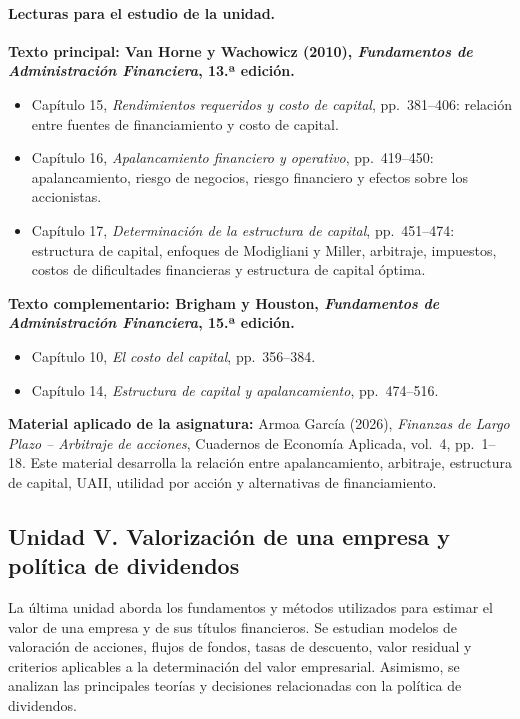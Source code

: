 \documentclass[12pt,a4paper]{article}
\begin{document}
\paragraph{Lecturas para el estudio de la unidad.}

\textbf{Texto principal: Van Horne y Wachowicz (2010),
\textit{Fundamentos de Administración Financiera}, 13.ª edición.}

\begin{itemize}
    \item Capítulo 15, \textit{Rendimientos requeridos y costo de capital},
    pp.~381--406: relación entre fuentes de financiamiento y costo de
    capital.

    \item Capítulo 16, \textit{Apalancamiento financiero y operativo},
    pp.~419--450: apalancamiento, riesgo de negocios, riesgo financiero
    y efectos sobre los accionistas.

    \item Capítulo 17, \textit{Determinación de la estructura de capital},
    pp.~451--474: estructura de capital, enfoques de Modigliani y Miller,
    arbitraje, impuestos, costos de dificultades financieras y estructura
    de capital óptima.
\end{itemize}

\noindent
\textbf{Texto complementario: Brigham y Houston,
\textit{Fundamentos de Administración Financiera}, 15.ª edición.}

\begin{itemize}
    \item Capítulo 10, \textit{El costo del capital},
    pp.~356--384.
    \item Capítulo 14, \textit{Estructura de capital y apalancamiento},
    pp.~474--516.
\end{itemize}

\noindent
\textbf{Material aplicado de la asignatura:}
Armoa García (2026), \textit{Finanzas de Largo Plazo -- Arbitraje de
acciones}, Cuadernos de Economía Aplicada, vol.~4,
pp.~1--18. Este material desarrolla la relación entre apalancamiento,
arbitraje, estructura de capital, UAII, utilidad por acción y alternativas
de financiamiento.
\parencite{armoa2026arbitraje}

\subsection{Unidad V. Valorización de una empresa y política de dividendos}

La última unidad aborda los fundamentos y métodos utilizados para estimar
el valor de una empresa y de sus títulos financieros. Se estudian modelos
de valoración de acciones, flujos de fondos, tasas de descuento, valor
residual y criterios aplicables a la determinación del valor empresarial.
Asimismo, se analizan las principales teorías y decisiones relacionadas
con la política de dividendos.
\parencite{uaProgramaFinanzasLargoPlazo}
\end{document}
